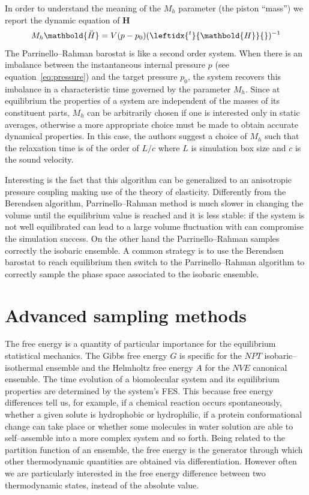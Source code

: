 In order to understand the meaning of the $M_h$ parameter (the piston ``mass'') we report the dynamic equation of $\mathbold H$
\begin{equation*}
	M_h \mathbold{\ddot H} = V (p - p_0) (\leftidx{^t}{\mathbold{H}}{})^{-1}
\end{equation*}
The Parrinello--Rahman barostat is like a second order system. When there is an imbalance between the
instantaneous internal pressure $p$ (see equation~\eqref{eq:pressure}) and the target pressure $p_0$, the system
recovers this imbalance in a characteristic time governed by the parameter $M_h$. Since at equilibrium the
properties of a system are independent of the masses of its constituent parts, $M_h$ can be arbitrarily chosen if
one is interested only in static averages, otherwise a more appropriate choice must be made to obtain accurate
dynamical properties. In this case, the authors suggest a choice of $M_h$ such that the relaxation time is of the
order of $L/c$ where $L$ is simulation box size and $c$ is the sound velocity.

Interesting is the fact that this algorithm can be generalized to an anisotropic pressure coupling making use of
the theory of elasticity. Differently from the Berendsen algorithm, Parrinello--Rahman method is much slower in
changing the volume until the equilibrium value is reached and it is less stable: if the system is not well
equilibrated can lead to a large volume fluctuation with can compromise the simulation success. On the other hand
the Parrinello--Rahman samples correctly the isobaric ensemble. A common strategy is to use the Berendsen
barostat to reach equilibrium then switch to the Parrinello--Rahman algorithm to correctly sample the phase space
associated to the isobaric ensemble.

\newpage
\section{Advanced sampling methods}
The free energy is a quantity of particular importance for the equilibrium statistical mechanics. The 
Gibbs free energy $G$ is specific for the $NPT$ isobaric--isothermal ensemble and the Helmholtz free energy $A$ 
for the $NVE$ canonical ensemble. The time evolution of a biomolecular system and its equilibrium properties are 
determined by the system's \ac{FES}. This because free energy differences tell us, for example, if a chemical 
reaction occurs spontaneously, whether a given solute is hydrophobic or hydrophilic, if a protein conformational 
change can take place or whether some molecules in water solution are able to self--assemble into a more complex 
system and so forth. Being related to the partition function of an ensemble, the free energy is the generator 
through which other thermodynamic quantities are obtained via differentiation. However often we are particularly 
interested in the free energy difference between two thermodynamic states, instead of the absolute value. 

